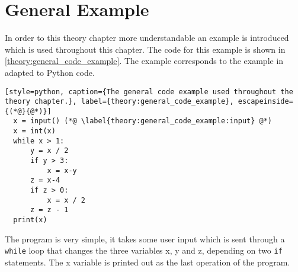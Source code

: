 \section{General Example}
In order to this theory chapter more understandable an example is introduced which is used throughout this chapter.
The code for this example is shown in \cref{theory:general_code_example}.
The example corresponds to the example in \citet{schwartzbach} adapted to Python code.
\begin{lstlisting}[style=python, caption={The general code example used throughout the theory chapter.}, label={theory:general_code_example}, escapeinside={(*@}{@*)}]
  x = input() (*@ \label{theory:general_code_example:input} @*)
  x = int(x)
  while x > 1:
      y = x / 2
      if y > 3:
          x = x-y
      z = x-4
      if z > 0:
          x = x / 2
      z = z - 1
  print(x)
\end{lstlisting}

The program is very simple, it takes some user input which is sent through a \texttt{while} loop that changes the three variables x, y and z, depending on two \texttt{if} statements.
The x variable is printed out as the last operation of the program.
